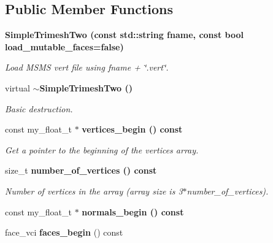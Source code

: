 \subsection*{Public Member Functions}
\begin{CompactItemize}
\item 
\bf{Simple\-Trimesh\-Two} (const std::string fname, const bool load\_\-mutable\_\-faces=false)\label{classASCbase_1_1geometry_1_1SimpleTrimeshTwo_b97e238865058c9209bb15c60535d08f}

\begin{CompactList}\small\item\em Load MSMS vert file using fname + \char`\"{}.vert\char`\"{}. \item\end{CompactList}\item 
virtual \bf{$\sim$Simple\-Trimesh\-Two} ()\label{classASCbase_1_1geometry_1_1SimpleTrimeshTwo_55ef71beb5a8ecd64e57dca7f11e5d27}

\begin{CompactList}\small\item\em Basic destruction. \item\end{CompactList}\item 
const my\_\-float\_\-t $\ast$ \bf{vertices\_\-begin} () const \label{classASCbase_1_1geometry_1_1SimpleTrimeshTwo_78f4469ff88513c39e96132017c319e6}

\begin{CompactList}\small\item\em Get a pointer to the beginning of the vertices array. \item\end{CompactList}\item 
size\_\-t \bf{number\_\-of\_\-vertices} () const \label{classASCbase_1_1geometry_1_1SimpleTrimeshTwo_8c0fc77ff8dd00a812bb4fdc2358c95c}

\begin{CompactList}\small\item\em Number of vertices in the array (array size is 3$\ast$number\_\-of\_\-vertices). \item\end{CompactList}\item 
const my\_\-float\_\-t $\ast$ \bf{normals\_\-begin} () const 
\item 
face\_\-vci \textbf{faces\_\-begin} () const \label{classASCbase_1_1geometry_1_1SimpleTrimeshTwo_214a85d1202d05e1f104322fe9e2496f}


\end{CompactItemize}
